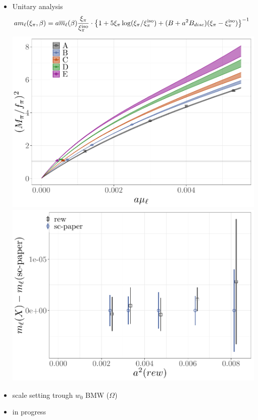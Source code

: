 \documentclass[xcolor={dvipsnames,table}]{beamer}
\begin{document}
\begin{frame}
  \begin{itemize}
    \item Unitary analysis
          \begin{align*}
            am_{\ell}(\xi_{\pi},\beta) & = a\overline{m}_{\ell}(\beta) \frac{\xi_{\pi}}{\xi_{\pi}^{\rm iso}} \cdot \left\{ 1 + 5\xi_{\pi}\log(\xi_{\pi}/\xi_{\pi}^{\rm iso}) + (B+a^2B_{disc})(\xi_{\pi} -\xi_{\pi}^{\rm iso}) \right\}^{-1}
          \end{align*}
          \includegraphics[scale=0.5]{plots/Mpi_rew}
          \includegraphics[scale=0.5]{plots/ml_scaling}
  \end{itemize}
\end{frame}

\begin{frame}
  \begin{itemize}
    \item scale setting trough $w_0$ BMW ($\Omega$)
    \item<2-> in progress
  \end{itemize}
\end{frame}
\end{document}

